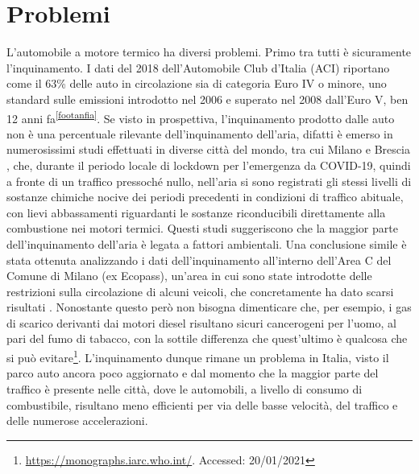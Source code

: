 \section{Problemi}

L'automobile a motore termico ha diversi problemi. Primo tra tutti è sicuramente l'inquinamento. I dati del 2018 dell'Automobile Club d'Italia (ACI) riportano come il 63\% delle auto in circolazione sia di categoria Euro IV o minore, uno standard sulle emissioni introdotto nel 2006 e superato nel 2008 dall'Euro V, ben 12 anni fa\textsuperscript{\ref{footanfia}}. Se visto in prospettiva, l'inquinamento prodotto dalle auto non è una percentuale rilevante dell'inquinamento dell'aria, difatti è emerso in numerosissimi studi effettuati in diverse città del mondo, tra cui Milano e Brescia \cite{collivignarelli2021analysis}\cite{cameletti2020effect}, che, durante il periodo locale di lockdown per l'emergenza da COVID-19,  quindi a fronte di un traffico pressoché nullo, nell'aria si sono registrati gli stessi livelli di sostanze chimiche nocive dei periodi precedenti in condizioni di traffico abituale, con lievi abbassamenti riguardanti le sostanze riconducibili direttamente alla combustione nei motori termici. Questi studi suggeriscono che la maggior parte dell'inquinamento dell'aria è legata a fattori ambientali. Una conclusione simile è stata ottenuta analizzando i dati dell'inquinamento all'interno dell'Area C del Comune di Milano (ex Ecopass), un'area in cui sono state introdotte delle restrizioni sulla circolazione di alcuni veicoli, che concretamente ha dato scarsi risultati \cite{trentini2014lombardy}. Nonostante questo però non bisogna dimenticare che, per esempio, i gas di scarico derivanti dai motori diesel risultano sicuri cancerogeni per l'uomo, al pari del fumo di tabacco, con la sottile differenza che quest'ultimo è qualcosa che si può evitare\footnote{\url{https://monographs.iarc.who.int/}. Accessed: 20/01/2021}. L'inquinamento dunque rimane un problema in Italia, visto il parco auto ancora poco aggiornato e dal momento che la maggior parte del traffico è presente nelle città, dove le automobili, a livello di consumo di combustibile, risultano meno efficienti per via delle basse velocità, del traffico e delle numerose accelerazioni.

